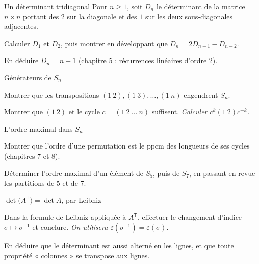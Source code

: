 \begin{exercice}[2]{Un déterminant tridiagonal}
Pour $n\geqslant1$, soit $D_n$ le déterminant de la matrice $n\times n$
portant des $2$ sur la diagonale et des $1$ sur les deux sous-diagonales
adjacentes.
\begin{questions}
  \item Calculer $D_1$ et $D_2$, puis montrer en développant que
    $D_n=2D_{n-1}-D_{n-2}$.
  \item En déduire $D_n=n+1$ (chapitre 5 : récurrences linéaires d'ordre
    2).
\end{questions}
\end{exercice}


\begin{exercice}[3]{Générateurs de $S_n$}
\begin{questions}
  \item Montrer que les transpositions $(1\ 2),(1\ 3),\dots,(1\ n)$
    engendrent $S_n$.
  \item Montrer que $(1\ 2)$ et le cycle $c=(1\ 2\ \dots\ n)$ suffisent.
    \emph{Calculer $c^{k}(1\ 2)c^{-k}$.}
\end{questions}
\end{exercice}

\begin{exercice}[3]{L'ordre maximal dans $S_n$}
\begin{questions}
  \item Montrer que l'ordre d'une permutation est le ppcm des longueurs de
    ses cycles (chapitres 7 et 8).
  \item Déterminer l'ordre maximal d'un élément de $S_5$, puis de $S_7$,
    en passant en revue les partitions de $5$ et de $7$.
\end{questions}
\end{exercice}

\begin{exercice}[3]{$\det\bigl(A^{\mathsf T}\bigr)=\det A$, par Leibniz}
\begin{questions}
  \item Dans la formule de Leibniz appliquée à $A^{\mathsf T}$, effectuer
    le changement d'indice $\sigma\mapsto\sigma^{-1}$ et conclure.
    \emph{On utilisera $\varepsilon(\sigma^{-1})=\varepsilon(\sigma)$.}
  \item En déduire que le déterminant est aussi alterné en les lignes, et
    que toute propriété « colonnes » se transpose aux lignes.
\end{questions}
\end{exercice}

